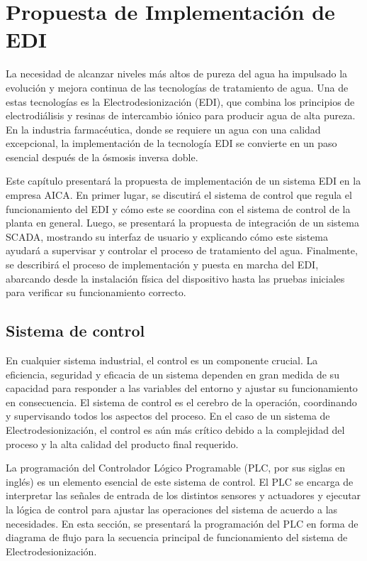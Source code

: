 \chapter{Propuesta de Implementación de EDI}
\label{cap:propuesta_implementacion}
La necesidad de alcanzar niveles más altos de pureza del agua ha impulsado
la evolución y mejora continua de las tecnologías de tratamiento de agua.
Una de estas tecnologías es la Electrodesionización (EDI), que combina
los principios de electrodiálisis y resinas de intercambio iónico para
producir agua de alta pureza. En la industria farmacéutica, donde se
requiere un agua con una calidad excepcional, la implementación de la
tecnología EDI se convierte en un paso esencial después de la ósmosis inversa doble.

Este capítulo presentará la propuesta de implementación de un sistema
EDI en la empresa AICA. En primer lugar, se discutirá el sistema de
control que regula el funcionamiento del EDI y cómo este se coordina
con el sistema de control de la planta en general.
Luego, se presentará la propuesta de integración de un sistema SCADA,
mostrando su interfaz de usuario y explicando cómo este sistema
ayudará a supervisar y controlar el proceso de tratamiento del agua.
Finalmente, se describirá el proceso de implementación y puesta en marcha del
EDI, abarcando desde la instalación física del dispositivo hasta las pruebas
iniciales para verificar su funcionamiento correcto.
\section{Sistema de control}
\label{sec:sistema_control}
En cualquier sistema industrial, el control es un componente crucial. La eficiencia, seguridad y eficacia de un sistema dependen en gran medida de su capacidad para responder a las variables del entorno y ajustar su funcionamiento en consecuencia. El sistema de control es el cerebro de la operación, coordinando y supervisando todos los aspectos del proceso. En el caso de un sistema de Electrodesionización, el control es aún más crítico debido a la complejidad del proceso y la alta calidad del producto final requerido.

La programación del Controlador Lógico Programable (PLC, por sus siglas en inglés) es un elemento esencial de este sistema de control. El PLC se encarga de interpretar las señales de entrada de los distintos sensores y actuadores y ejecutar la lógica de control para ajustar las operaciones del sistema de acuerdo a las necesidades. En esta sección, se presentará la programación del PLC en forma de diagrama de flujo para la secuencia principal de funcionamiento del sistema de Electrodesionización.
